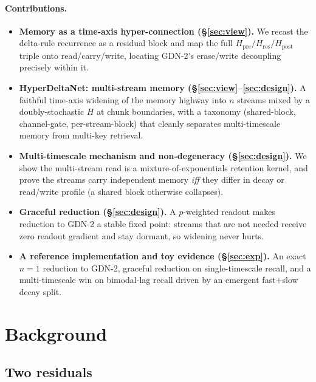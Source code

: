 \documentclass[11pt,letterpaper,logo]{yalearxiv}
\newcommand{\Hres}{H_{\mathrm{res}}}
\newcommand{\Hpre}{H_{\mathrm{pre}}}
\newcommand{\Hpost}{H_{\mathrm{post}}}
\begin{document}
\paragraph{Contributions.}
\begin{itemize}[leftmargin=1.5em,itemsep=1pt,topsep=2pt]
  \item \textbf{Memory as a time-axis hyper-connection (\S\ref{sec:view}).} We
  recast the delta-rule recurrence as a residual block and map the full
  $\Hpre/\Hres/\Hpost$ triple onto read/carry/write, locating GDN-2's erase/write
  decoupling precisely within it.
  \item \textbf{HyperDeltaNet: multi-stream memory (\S\ref{sec:view}--\ref{sec:design}).}
  A faithful time-axis widening of the memory highway into $n$ streams mixed by a
  doubly-stochastic $H$ at chunk boundaries, with a taxonomy (shared-block,
  channel-gate, per-stream-block) that cleanly separates multi-timescale memory
  from multi-key retrieval.
  \item \textbf{Multi-timescale mechanism and non-degeneracy (\S\ref{sec:design}).}
  We show the multi-stream read is a mixture-of-exponentials retention kernel, and
  prove the streams carry independent memory \emph{iff} they differ in decay or
  read/write profile (a shared block otherwise collapses).
  \item \textbf{Graceful reduction (\S\ref{sec:design}).} A $p$-weighted readout
  makes reduction to GDN-2 a stable fixed point: streams that are not needed
  receive zero readout gradient and stay dormant, so widening never hurts.
  \item \textbf{A reference implementation and toy evidence (\S\ref{sec:exp}).} An
  exact $n{=}1$ reduction to GDN-2, graceful reduction on single-timescale recall,
  and a multi-timescale win on bimodal-lag recall driven by an emergent
  fast$+$slow decay split.
\end{itemize}


\section{Background}
\label{sec:bg}

\subsection{Two residuals}
\label{sec:two-residuals}
\end{document}
